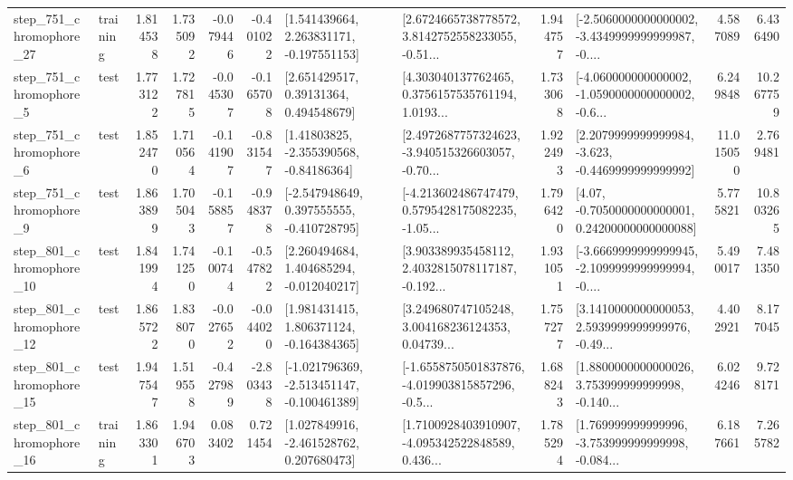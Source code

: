 \begin{tabular}{llrrrrllrlrr}
  step\_751\_chromophore\_27 &  training &      1.814538 &    1.735092 &     -0.079446 & -0.401022 &    [1.541439664, 2.263831171, -0.197551153] &  [2.6724665738778572, 3.8142752558233055, -0.51... &       1.944757 &  [-2.5060000000000002, -3.4349999999999987, -0.... &            4.587089 &          6.436490 \\
   step\_751\_chromophore\_5 &      test &      1.773122 &    1.727815 &     -0.045307 & -0.165708 &      [2.651429517, 0.39131364, 0.494548679] &  [4.303040137762465, 0.3756157535761194, 1.0193... &       1.733068 &  [-4.060000000000002, -1.0590000000000002, -0.6... &            6.249848 &         10.267759 \\
   step\_751\_chromophore\_6 &      test &      1.852470 &    1.710564 &     -0.141907 & -0.831547 &     [1.41803825, -2.355390568, -0.84186364] &  [2.4972687757324623, -3.940515326603057, -0.70... &       1.922493 &  [2.2079999999999984, -3.623, -0.4469999999999992] &           11.015050 &          2.769481 \\
   step\_751\_chromophore\_9 &      test &      1.863899 &    1.705043 &     -0.158857 & -0.948378 &   [-2.547948649, 0.397555555, -0.410728795] &  [-4.213602486747479, 0.5795428175082235, -1.05... &       1.796420 &   [4.07, -0.7050000000000001, 0.24200000000000088] &            5.775821 &         10.803265 \\
  step\_801\_chromophore\_10 &      test &      1.841994 &    1.741250 &     -0.100744 & -0.547822 &    [2.260494684, 1.404685294, -0.012040217] &  [3.903389935458112, 2.4032815078117187, -0.192... &       1.931051 &  [-3.6669999999999945, -2.1099999999999994, -0.... &            5.490017 &          7.481350 \\
  step\_801\_chromophore\_12 &      test &      1.865722 &    1.838070 &     -0.027652 & -0.044020 &    [1.981431415, 1.806371124, -0.164384365] &  [3.249680747105248, 3.004168236124353, 0.04739... &       1.757277 &  [3.1410000000000053, 2.5939999999999976, -0.49... &            4.402921 &          8.177045 \\
  step\_801\_chromophore\_15 &      test &      1.947547 &    1.519558 &     -0.427989 & -2.803438 &  [-1.021796369, -2.513451147, -0.100461389] &  [-1.6558750501837876, -4.019903815857296, -0.5... &       1.688243 &  [1.8800000000000026, 3.753999999999998, -0.140... &            6.024246 &          9.728171 \\
  step\_801\_chromophore\_16 &  training &      1.863301 &    1.946703 &      0.083402 &  0.721454 &    [1.027849916, -2.461528762, 0.207680473] &  [1.7100928403910907, -4.095342522848589, 0.436... &       1.785294 &  [1.769999999999996, -3.753999999999998, -0.084... &            6.187661 &          7.265782 \\

\end{tabular}
